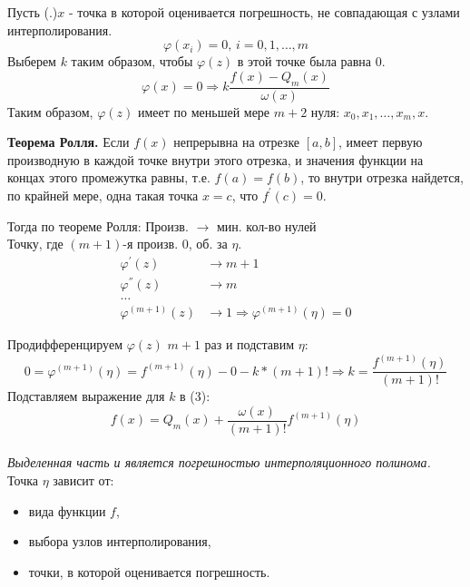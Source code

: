 \documentclass[a4paper,11pt]{article}
\begin{document}
Пусть (.)$x$ - точка в которой оценивается погрешность, не совпадающая с узлами интерполирования.
\[\varphi(x_i) = 0, \, i = 0, 1, \dots, m\]
Выберем $k$ таким образом, чтобы $\varphi(z)$ в этой точке была равна $0$.
\begin{equation}
  \varphi(x) = 0 \Rightarrow k \frac{f(x) - Q_m(x)}{\omega(x)}
\end{equation}
Таким образом, $\varphi(z)$ имеет по меньшей мере $m+2$ нуля: $x_0, x_1, \dots, x_m, x$. \\
\begin{importantblock}
  \textbf{Теорема Ролля.}
  Если $f(x)$ непрерывна на отрезке $[a,b]$, имеет первую производную в каждой точке внутри этого отрезка, и значения функции на концах этого промежутка равны, т.е. $f(a)=f(b)$, то внутри отрезка найдется, по крайней мере, одна такая точка $x=c$, что $f^{'}(c)=0$.
\end{importantblock}
Тогда по теореме Ролля:
\marginpar
{
  \footnotesize Произв. $\rightarrow$ мин. кол-во нулей \\

  \footnotesize Точку, где $(m+1)$-я произв. 0, об. за $\eta$.
}
\begin{align*}
  \varphi^{'}(z) & \rightarrow m + 1 \\
  \varphi^{''}(z) & \rightarrow m \\
  \dots \\
  \varphi^{(m + 1)}(z) & \rightarrow 1 \Rightarrow \varphi^{(m + 1)}(\eta) = 0
\end{align*}

Продифференцируем $\varphi(z)$ $m+1$ раз и подставим $\eta$:
\[0 = \varphi^{(m+1)}(\eta) = f^{(m+1)}(\eta) - 0 - k * (m + 1)! \Rightarrow k = \frac{f^{(m+1)}(\eta)}{(m+1)!}\]
Подставляем выражение для $k$ в (3):
\[f(x) = Q_m(x) + \boxed{\frac{\omega(x)}{(m+1)!}f^{(m+1)}(\eta)}\] \\
\textit{Выделенная часть и является погрешностью интерполяционного полинома.}
Точка $\eta$ зависит от:
\begin{itemize}
  \item вида функции $f$,
  \item выбора узлов интерполирования,
  \item точки, в которой оценивается погрешность.
\end{itemize}
\end{document}
